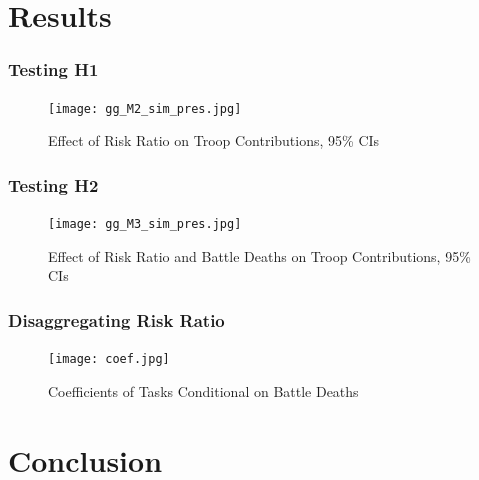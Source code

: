 \documentclass{beamer}
\begin{document}
\section{Results}


\begin{frame}
\frametitle{Testing H1}
\vspace{-4mm}
\begin{figure}[t]
\centering
\texttt{[image: gg\_M2\_sim\_pres.jpg]}
\vspace{-5mm}
\caption{\scriptsize Effect of Risk Ratio on Troop Contributions, 95\% CIs}
\label{H1}
\end{figure}

\end{frame}


\begin{frame}
\frametitle{Testing H2}
\vspace{-4mm}
\begin{figure}[t]
\centering
\texttt{[image: gg\_M3\_sim\_pres.jpg]}
\vspace{-5mm}
\caption{\scriptsize Effect of Risk Ratio and Battle Deaths on Troop Contributions, 95\% CIs}
\label{H2}
\end{figure}

\end{frame}


\begin{frame}
\frametitle{Disaggregating Risk Ratio}


\begin{figure}[t]
\centering
\vspace{-5mm}
\texttt{[image: coef.jpg]}
\vspace{-4mm}
\caption{\scriptsize Coefficients of Tasks Conditional on Battle Deaths}
\label{Disag}
\end{figure}

\end{frame}

\section{Conclusion}

\end{document}
